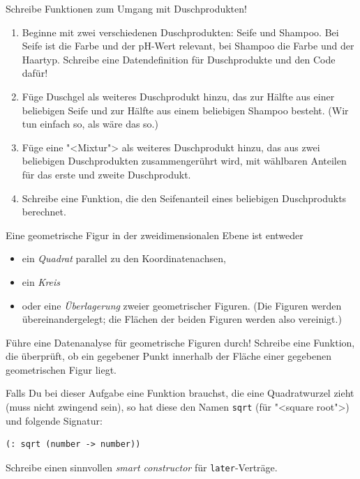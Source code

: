 \begin{aufgabe}
  Schreibe Funktionen zum Umgang mit Duschprodukten!
  \begin{enumerate}
  \item Beginne mit zwei verschiedenen Duschprodukten: Seife und
    Shampoo.  Bei Seife ist die Farbe und der pH-Wert relevant, bei
    Shampoo die Farbe und der Haartyp.  Schreibe eine Datendefinition
    für Duschprodukte und den Code dafür!
  \item Füge Duschgel als weiteres Duschprodukt hinzu, das zur Hälfte
    aus einer beliebigen Seife und zur Hälfte aus einem beliebigen
    Shampoo besteht.  (Wir tun einfach so, als wäre das so.)
  \item Füge eine "<Mixtur"> als weiteres Duschprodukt hinzu, das aus
    zwei beliebigen Duschprodukten zusammengerührt wird, mit 
    wählbaren Anteilen für das erste und zweite Duschprodukt.
  \item Schreibe eine Funktion, die den Seifenanteil eines beliebigen
    Duschprodukts berechnet.
  \end{enumerate}
\end{aufgabe}

\begin{aufgabe}
Eine geometrische Figur in der zweidimensionalen Ebene ist entweder
%
\begin{itemize}
\item ein \textit{Quadrat} parallel zu den Koordinatenachsen,
\item ein \textit{Kreis}
\item oder eine \textit{Überlagerung} zweier geometrischer Figuren.
  (Die Figuren werden übereinandergelegt; die Flächen der beiden Figuren werden also vereinigt.)
\end{itemize}
%
Führe eine Datenanalyse für geometrische Figuren durch! Schreibe eine
Funktion, die überprüft, ob ein gegebener Punkt innerhalb der Fläche
einer gegebenen geometrischen Figur liegt.

Falls Du bei dieser Aufgabe eine Funktion brauchst, die eine
Quadratwurzel zieht (muss nicht zwingend sein), so hat diese den Namen
\lstinline{sqrt} (für "<square root">) und
folgende Signatur:
\begin{lstlisting}
(: sqrt (number -> number))
\end{lstlisting}
\end{aufgabe}

\begin{aufgabe}
  Schreibe einen sinnvollen \textit{smart constructor} für
  \lstinline{later}-Verträge.
\end{aufgabe}

